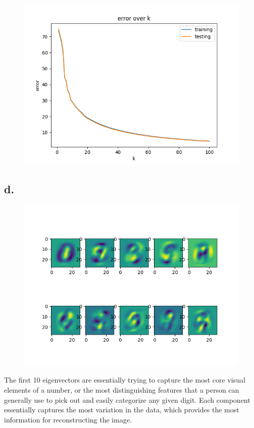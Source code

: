 \documentclass{article}
\newcommand{\1}{\mathbf{1}}
\begin{document}
{\begin{figure}[h]
  \centering
  \includegraphics[width=130mm]{../hw4-code/results/a3_cerr.png}
\end{figure}

\newpage

\subsection*{d.}

\begin{figure}[!hb]
  \centering
  \includegraphics[width=130mm]{../hw4-code/results/a3_d.png}
\end{figure}

The first 10 eigenvectors are essentially trying to capture the most core visual elements of a number, or the most distinguishing features that a person can generally use to pick out and easily categorize any given digit. Each component essentially captures the most variation in the data, which provides the most information for reconstructing the image.

}
\end{document}
